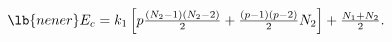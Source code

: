 \begin{equation}
\begin{array}{l}
\lb{nener}
E_{c}=
k_{1}\left[ p\frac{\left( N_{2}-1\right) \left(
N_{2}-2\right) }{2}+\frac{\left( p-1\right) 
\left( p-2\right) }{2}N_{2} \right] 
+\frac{N_{1}+N_{2}}{2}.
\end{array}
\end{equation}

